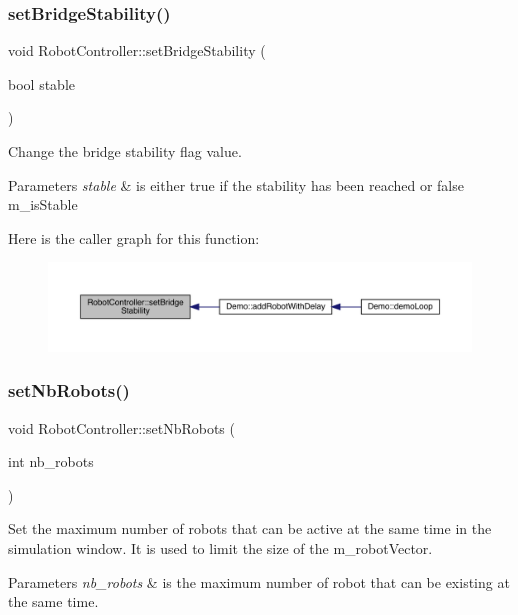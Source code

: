 \subsubsection{\texorpdfstring{set\+Bridge\+Stability()}{setBridgeStability()}}
{\footnotesize\ttfamily void Robot\+Controller\+::set\+Bridge\+Stability (\begin{DoxyParamCaption}\item[{bool}]{stable }\end{DoxyParamCaption})}

Change the bridge stability flag value. 
\begin{DoxyParams}{Parameters}
{\em stable} & is either true if the stability has been reached or false  m\+\_\+is\+Stable \\
\hline
\end{DoxyParams}
Here is the caller graph for this function\+:\nopagebreak
\begin{figure}[H]
\begin{center}
\leavevmode
\includegraphics[width=350pt]{class_robot_controller_a19191b156161bd7a3978659329ceaad2_icgraph}
\end{center}
\end{figure}
\mbox{\label{class_robot_controller_adf00a753bc750624e805f57f8998ad78}} 
\subsubsection{\texorpdfstring{set\+Nb\+Robots()}{setNbRobots()}}
{\footnotesize\ttfamily void Robot\+Controller\+::set\+Nb\+Robots (\begin{DoxyParamCaption}\item[{int}]{nb\+\_\+robots }\end{DoxyParamCaption})}

Set the maximum number of robots that can be active at the same time in the simulation window. It is used to limit the size of the m\+\_\+robot\+Vector. 
\begin{DoxyParams}{Parameters}
{\em nb\+\_\+robots} & is the maximum number of robot that can be existing at the same time. \\
\hline
\end{DoxyParams}
\mbox{\label{class_robot_controller_a797837410a2802b5d7399d132924ba2c}} 
